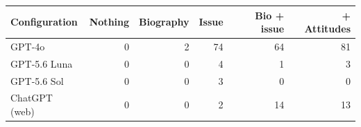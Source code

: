 \begin{tabular}{lrrrrr}
\toprule
Configuration & Nothing & Biography & Issue & Bio + issue & + Attitudes \\
\midrule
GPT-4o & 0 & 2 & 74 & 64 & 81 \\
GPT-5.6 Luna & 0 & 0 & 4 & 1 & 3 \\
GPT-5.6 Sol & 0 & 0 & 3 & 0 & 0 \\
ChatGPT (web) & 0 & 0 & 2 & 14 & 13 \\
\bottomrule
\end{tabular}
